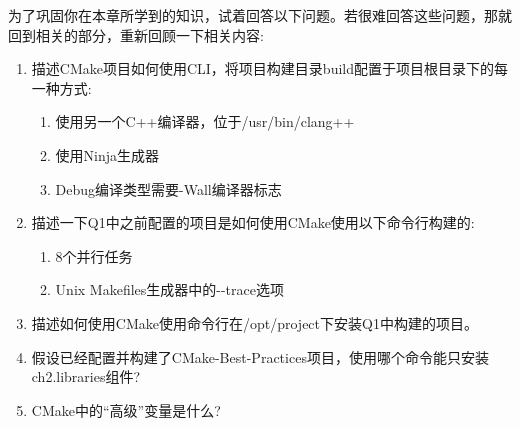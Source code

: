 为了巩固你在本章所学到的知识，试着回答以下问题。若很难回答这些问题，那就回到相关的部分，重新回顾一下相关内容:

\begin{enumerate}
\item 
描述CMake项目如何使用CLI，将项目构建目录build配置于项目根目录下的每一种方式:

\begin{enumerate}[label=\Alph*.]
\item 
使用另一个C++编译器，位于/usr/bin/clang++

\item 
使用Ninja生成器

\item 
Debug编译类型需要-Wall编译器标志
\end{enumerate}

\item 
描述一下Q1中之前配置的项目是如何使用CMake使用以下命令行构建的:

\begin{enumerate}[label=\Alph*.]
\item 
8个并行任务

\item 
Unix Makefiles生成器中的-{}-trace选项
\end{enumerate}

\item 
描述如何使用CMake使用命令行在/opt/project下安装Q1中构建的项目。

\item 
假设已经配置并构建了CMake-Best-Practices项目，使用哪个命令能只安装ch2.libraries组件?

\item 
CMake中的“高级”变量是什么?
\end{enumerate}